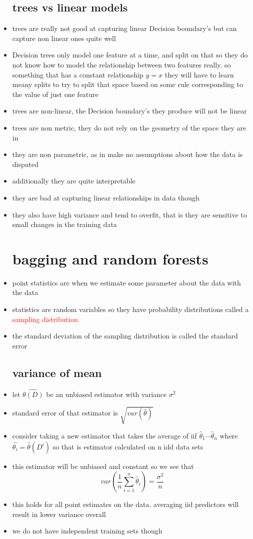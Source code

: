 \documentclass{article}
\begin{document}
\begin{itemize}
\subsection*{trees vs linear models}
\item trees are really not good at capturing linear Decision boundary's but can capture non linear ones quite well
\item Decision trees only model one feature at a time, and split on that so they do not know how to model the relationship between two features really. so something that has a constant relationship $y=x$ they will have to learn meany splits to try to split that space based on some rule corresponding to the value of just one feature
\item trees are non-linear, the Decision boundary's they produce will not be linear
\item trees are non metric, they do not rely on the geometry of the space they are in 
\item they are non parametric, as in make no assumptions about how the data is disputed 
\item additionally they are quite interpretable
\item they are bad at capturing linear relationships in data though  
\item they also have high variance and tend to overfit, that is they are sensitive to small changes in the training data 
\section{bagging and random forests}
\item point statistics are when we estimate some parameter about the data with the data 
\item statistics are random variables so they have probability distributions called a \textcolor{red}{sampling distribution} 
\item the standard deviation of the sampling distribution is called the standard error 
\subsection*{variance of mean }
\item let $\hat{\theta(D)}$ be an unbiased estimator with variance $\sigma^{2}$ 
\item standard error of that estimator is $\sqrt{var(\hat{\theta}
)}$
\item consider taking a new estimator that takes the average of iif $\hat{\theta}_1\cdots \hat\theta_{n}$ where $\hat{\theta_i}=\hat{\theta}(D^{i})$ so that is estimator calculated on n idd data sets 
\item this estimator will be unbiased and constant so we see that $$var(\frac{1}{n}\sum_{i=1}^{n}\hat{\theta}_i)=\frac{\sigma^{2}}{n}$$
\item this holds for all point estimates on the data. averaging iid predictors will result in lower variance overall 
\item we do not have independent training sets though 

\end{itemize}
\end{document}
